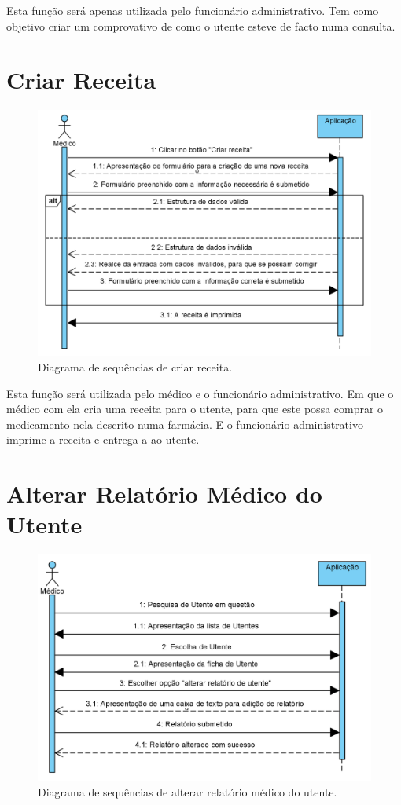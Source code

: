 \documentclass[11pt,a4paper,twoside]{report}
\begin{document}
Esta função será apenas utilizada pelo funcionário administrativo. Tem como objetivo criar um comprovativo de como o utente esteve de facto numa consulta. 


\section{Criar Receita}

\begin{figure}[H]
	\centering
	\includegraphics[width=0.7\linewidth]{image/SequencialDiagramsImages/CriarReceita}
	\caption [Diagrama de sequências de criar receita.] {Diagrama de sequências de criar receita.}
	\label{fig:criarreceitaF}
\end{figure}

Esta função será utilizada pelo médico e o funcionário administrativo. Em que o médico com ela cria uma receita para o utente, para que este possa comprar o medicamento nela descrito numa farmácia. E o funcionário administrativo imprime a receita e entrega-a ao utente. 

\section{Alterar Relatório Médico do Utente }

\begin{figure}[H]
	\centering
	\includegraphics[width=0.7\linewidth]{image/SequencialDiagramsImages/AlterarRelatórioMédico}
	\caption [Diagrama de sequências de alterar relatório médico do utente.] {Diagrama de sequências de alterar relatório médico do utente.}
	\label{fig:alterarrelatoriomedicoF}
\end{figure}
\end{document}
